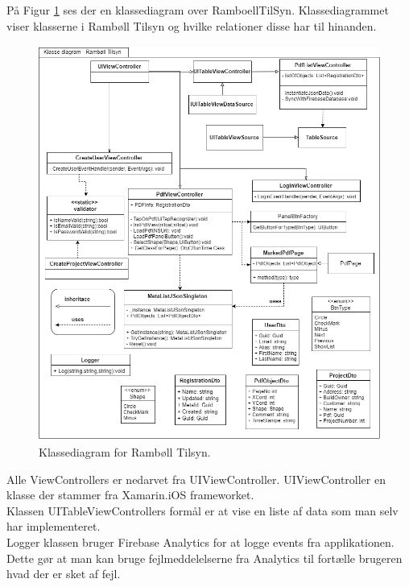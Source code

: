 På Figur \ref{fig:KlasseDiagram} ses der en klassediagram over RamboellTilSyn. Klassediagrammet viser klasserne i Rambøll Tilsyn og hvilke relationer disse har til hinanden.
\begin{figure}[H] %
	\centering
	\includegraphics[height=13cm, width=17cm]{Arkitektur/KlasseDiagram}
	\caption{Klassediagram for Rambøll Tilsyn.}
	\label{fig:KlasseDiagram}
\end{figure}


Alle ViewControllers er nedarvet fra UIViewController\cite{UIViewController}. UIViewController en klasse der stammer fra Xamarin.iOS frameworket. \\
Klassen UITableViewControllers formål er at vise en liste af data som man selv har implementeret. \\
Logger klassen bruger Firebase Analytics for at logge events fra applikationen. Dette gør at man kan bruge fejlmeddelelserne fra Analytics til fortælle brugeren hvad der er sket af fejl.  
